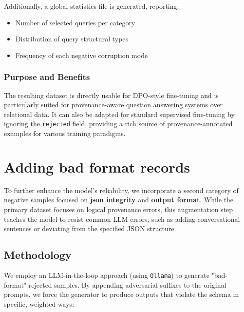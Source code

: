 \documentclass{article}
\begin{document}
Additionally, a global statistics file is generated, reporting:
\begin{itemize}
    \item Number of selected queries per category
    \item Distribution of query structural types
    \item Frequency of each negative corruption mode
\end{itemize}

\subsubsection{Purpose and Benefits}

The resulting dataset is directly usable for DPO-style fine-tuning and is particularly suited for provenance-aware question answering systems over relational data.
It can also be adapted for standard supervised fine-tuning by ignoring the \texttt{rejected} field, providing a rich source of provenance-annotated examples for various training paradigms.

\section{Adding bad format records}

To further enhance the model's reliability, we incorporate a second category of negative samples focused on \textbf{json integrity} and \textbf{output format}. While the primary dataset focuses on logical provenance errors, this augmentation step teaches the model to resist common LLM errors, such as adding conversational sentences or deviating from the specified JSON structure.

\subsection{Methodology}
We employ an LLM-in-the-loop approach (using \texttt{Ollama}) to generate "bad-format" rejected samples. By appending adversarial suffixes to the original prompts, we force the generator to produce outputs that violate the schema in specific, weighted ways:
\end{document}
